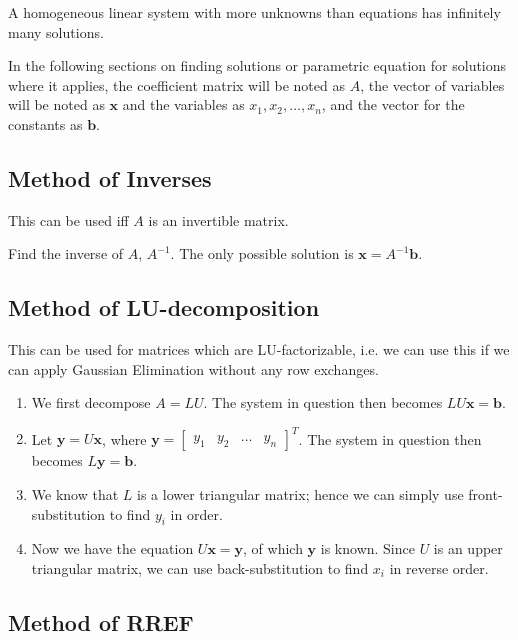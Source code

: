 \documentclass{report}
\begin{document}
		\begin{coro}
			A homogeneous linear system with more unknowns than equations has infinitely many solutions.
		\end{coro}
		
		In the following sections on finding solutions or parametric equation for solutions where it applies, the coefficient matrix will be noted as $A$, the vector of variables will be noted as $\bm{x}$ and the variables as $x_1, x_2, \dots, x_n$, and the vector for the constants as $\bm{b}$.
		
		\subsection{Method of Inverses}
		
		This can be used iff $A$ is an invertible matrix.
		
		Find the inverse of $A$, $A^{-1}$.
		The only possible solution is $\bm{x}=A^{-1}\bm{b}$.
		
		\subsection{Method of LU-decomposition}

			This can be used for matrices which are LU-factorizable, i.e. we can use this if we can apply Gaussian Elimination without any row exchanges.
			
			\begin{enumerate}
				\item We first decompose $A=LU$. The system in question then becomes $LU\bm{x}=\bm{b}$.
				\item Let $\bm{y}=U\bm{x}$, where $\bm{y}=\begin{bmatrix}y_1 & y_2 & \dots & y_n \end{bmatrix}^T$. The system in question then becomes $L\bm{y}=\bm{b}$.
				\item We know that $L$ is a lower triangular matrix; hence we can simply use front-substitution to find $y_i$ in order.
				\item Now we have the equation $U\bm{x}=\bm{y}$, of which $\bm{y}$ is known. Since $U$ is an upper triangular matrix, we can use back-substitution to find $x_i$ in reverse order.
			\end{enumerate}
		
		\subsection{Method of RREF}\label{mthd_rref}
		
\end{document}
